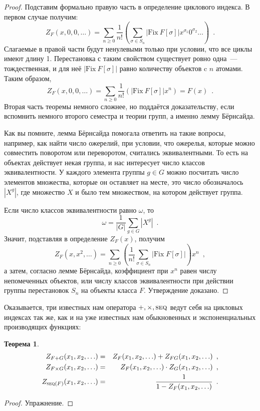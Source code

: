 \documentclass[a5paper]{article}
\def \seq {\text{\textsc{seq}}}
\theoremstyle{definition}
\newtheorem*{theorem}{Теорема}
\begin{document}
\begin{proof}
    Подставим формально правую часть в определение циклового индекса. В первом случае получим:
	\[
		Z_F(x, 0, 0, \ldots) = \sum_{n \geq 0} \dfrac{1}{n!} \left(
			\sum_{\sigma \in S_n} |\mathrm{Fix}\ F[\sigma]|x^{\sigma_1} 
			0^{\sigma_2} \ldots
		\right) \enspace .
	\]
    Слагаемые в правой части будут ненулевыми только при условии, что все циклы имеют длину 1.
Перестановка с таким свойством существует ровно одна~--- тождественная, и для
неё \( |\mathrm{Fix}\ F[\sigma]| \) равно количеству объектов c \( n \) атомами. 
Таким образом,  
	\[
		Z_F(x, 0, 0, \ldots) = \sum_{n \geq 0} \dfrac{1}{n!} \left(
			 |\mathrm{Fix}\ F[\sigma]| x^n
            \right) = F(x) \enspace .
	\]
Вторая часть теоремы немного сложнее, но поддаётся доказательству, если
вспомнить немного второго семестра и теории групп, а именно лемму Бёрнсайда.

Как вы помните, лемма Бёрнсайда помогала ответить на такие вопросы, например,
как найти число ожерелий, при условии, что ожерелья, которые можно совместить
поворотом или переворотом, считались эквивалентными. То есть на объектах
действует некая группа, и нас интересует число классов эквивалентности. У
каждого элемента группы \( g \in G \) можно посчитать число элементов множества,
которые он оставляет на месте, это число обозначалось \( |X^g| \), где множество
\( X \) и было тем множеством, на котором действует группа.

Если число классов эквивалентности равно \( \omega \), то 
\[
	\omega = \dfrac{1}{|G|} \sum_{g \in G} |X^g| \enspace .
\]
Значит, подставляя в определение \( Z_F(x) \), получим
\[
	Z_F(x, x^2, \ldots) = \sum_{n \geq 0} \left(\dfrac{1}{n!} 
		\sum_{\sigma \in S_n} |\mathrm{Fix} \; F[\sigma]|
	\right) x^n \enspace ,
\]
а затем, согласно лемме Бёрнсайда, коэффициент при \( x^n \) равен числу
непомеченных объектов, или числу классов эквивалентности при действии группы
перестановок \( S_n  \) на объекты класса \( F \). Утверждение доказано.
\end{proof}




Оказывается, три известных нам оператора \( +, \times, \seq \) ведут себя на
цикловых индексах так же, как и на уже известных нам обыкновенных и
экспоненциальных производящих функциях:
\begin{theorem}
	\begin{eqnarray*}
		Z_{F + G}(x_1, x_2, \ldots) &=& Z_{F}(x_1, x_2, \ldots) + Z_{FG}(x_1, x_2, \ldots) \enspace , \\
		Z_{F \times G}(x_1, x_2, \ldots) &=& Z_{F}(x_1, x_2, \ldots) \cdot Z_{G}(x_1, x_2, \ldots) \enspace , \\
		Z_{\seq(F)}(x_1, x_2, \ldots) &=& \dfrac{1}{1 - Z_{F}(x_1, x_2, \ldots)} \enspace .
	\end{eqnarray*}
\end{theorem}
\begin{proof}
	Упражнение.
\end{proof}
\end{document}
